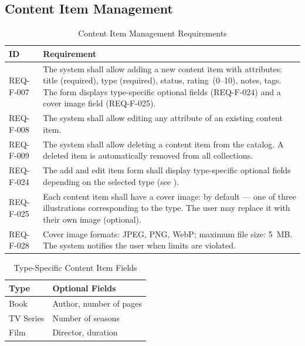 \subsection{Content Item Management}

\begin{table}[h]
\caption{Content Item Management Requirements}
\label{tab:content}
\begin{tabular}{L{2.5cm} L{11.5cm}}
\toprule
\textbf{ID} & \textbf{Requirement} \\
\midrule
REQ-F-007 & The system shall allow adding a new content item with attributes: title (required), type (required), status, rating~(0--10), notes, tags. The form displays type-specific optional fields (REQ-F-024) and a cover image field (REQ-F-025).  \\
\addlinespace
REQ-F-008 & The system shall allow editing any attribute of an existing content item.  \\
\addlinespace
REQ-F-009 & The system shall allow deleting a content item from the catalog. A deleted item is automatically removed from all collections.  \\
\addlinespace
REQ-F-024 & The add and edit item form shall display type-specific optional fields depending on the selected type (see ).  \\
\addlinespace
REQ-F-025 & Each content item shall have a cover image: by default --- one of three illustrations corresponding to the type. The user may replace it with their own image (optional).  \\
\addlinespace
REQ-F-028 & Cover image formats: JPEG, PNG, WebP; maximum file size: 5~MB. The system notifies the user when limits are violated.  \\
\bottomrule
\end{tabular}
\end{table}

\begin{table}[h]
\caption{Type-Specific Content Item Fields}
\label{tab:type-fields}
\begin{tabular}{L{3cm} L{11cm}}
\toprule
\textbf{Type} & \textbf{Optional Fields} \\
\midrule
Book & Author, number of pages \\
TV Series & Number of seasons \\
Film & Director, duration \\
\bottomrule
\end{tabular}
\end{table}

